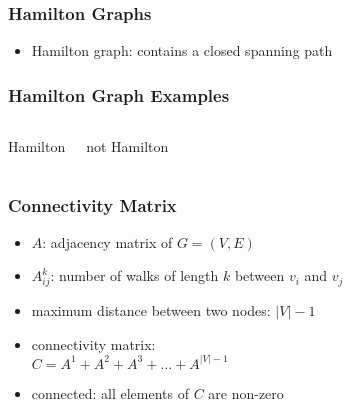 \documentclass[dvipsnames]{beamer}
\begin{document}
\begin{frame}
  \frametitle{Hamilton Graphs}

  \begin{itemize}
    \item \alert{Hamilton graph}: contains a closed spanning path
  \end{itemize}
\end{frame}

\begin{frame}
  \frametitle{Hamilton Graph Examples}

  \begin{columns}
    \begin{center}
      Hamilton

      \bigskip
    \end{center}

    \begin{center}
      not Hamilton

      \bigskip
    \end{center}
  \end{columns}
\end{frame}

\begin{frame}
  \frametitle{Connectivity Matrix}

  \begin{itemize}
    \item $A$: adjacency matrix of $G=(V,E)$
    \item $A^k_{ij}$: number of walks of length $k$ between $v_i$ and $v_j$

    \medskip
    \item maximum distance between two nodes: $|V|-1$

    \pause
    \medskip
    \item connectivity matrix:\\
      $C = A^1 + A^2 + A^3 + \dots + A^{|V|-1}$
    \item connected: all elements of $C$ are non-zero
  \end{itemize}
\end{frame}
\end{document}
